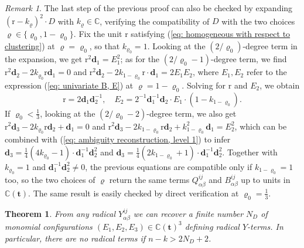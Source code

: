 \documentclass[10pt]{article}
\newtheorem{thm}{Theorem}
\theoremstyle{remark}%
\newtheorem{rem}{Remark}%
\theoremstyle{definition}%
\begin{document}
\begin{rem}
The last step of the previous proof can also be checked by expanding $(\mathrm{r}-k_{\varrho})^{2}\cdot D$ with $k_{\varrho}\in\mathbb{C}$, verifying the compatibility of $D$ with the two choices $\varrho\in\{\varrho_{0},1-\varrho_{0}\}$. Fix the unit $\mathrm{r}$ satisfying (\ref{eq: homogeneous with respect to clustering}) at $\varrho=\varrho_{0}$, so that $k_{\varrho_{0}}=1$. Looking at the $(2/\varrho_{0})$-degree term in the expansion, we get $\mathrm{r}^{2}\mathbf{d}_{1}=E_{1}^{2}$; as for the $(2/\varrho_{0}-1)$-degree term, we find $\mathrm{r}^{2}\mathbf{d}_{2}-2k_{\varrho_{0}}\mathrm{r}\mathbf{d}_{1}=0$ and $\mathrm{r}^{2}\mathbf{d}_{2}-2k_{1-\varrho_{0}}\mathrm{r}\cdot\mathbf{d}_{1}=2E_{1}E_{2}$, where $E_{1},E_{2}$ refer to the expression (\ref{eq: univariate B, E}) at $\varrho=1-\varrho_{0}$. Solving for $\mathrm{r}$ and $E_{2}$, we obtain 
\begin{equation}
    \mathrm{r}=2\mathbf{d}_{1}\mathbf{d}_{2}^{-1},\quad E_{2}=2^{-1}\mathbf{d}_{1}^{-1}\mathbf{d}_{2}\cdot E_{1}\cdot(1-k_{1-\varrho_{0}}).
\label{eq: ambiguity reconstruction, level 1}
\end{equation}
If $\varrho_{0}<\frac{1}{3}$, looking at the $(2/\varrho_{0}-2)$-degree term, we also get $\mathrm{r}^{2}\mathbf{d}_{3}-2k_{\varrho_{0}}\mathrm{r}\mathbf{d}_{2}+\mathbf{d}_{1}=0$ and $\mathrm{r}^{2}\mathbf{d}_{3}-2k_{1-\varrho_{0}}\mathrm{r}\mathbf{d}_{2}+k_{1-\varrho_{0}}^{2}\mathbf{d}_{1}=E_{2}^{2}$, which can be combined with (\ref{eq: ambiguity reconstruction, level 1}) to infer $\mathbf{d}_{3}=\frac{1}{4}(4k_{\varrho_{0}}-1)\cdot\mathbf{d}_{1}^{-1}\mathbf{d}_{2}^{2}$ and $\mathbf{d}_{3}=\frac{1}{4}(2k_{1-\varrho_{0}}+1)\cdot\mathbf{d}_{1}^{-1}\mathbf{d}_{2}^{2}$. Together with $k_{\varrho_{0}}=1$ and $\mathbf{d}_{1}^{-1}\mathbf{d}_{2}^{2}\neq0$, the previous equations are compatible only if $k_{1-\varrho_{0}}=1$ too, so the two choices of $\varrho$ return the same terms $Q_{\alpha\beta}^{ij}$ and $B_{\alpha\beta}^{ij}$ up to units in $\mathbb{C}(\mathbf{t})$. The same result is easily checked by direct verification at $\varrho_{0}=\frac{1}{3}$. 
\end{rem}
\begin{thm}
\label{thm: distinguishability terms from Y} From any radical $Y_{\alpha\beta}^{ij}$
we can recover a finite number $N_{D}$ of monomial configurations $(E_{1},E_{2},E_{3})\in\mathbb{C}(\mathbf{t})^{3}$ defining radical $Y$-terms. 
In particular, there are no radical terms if $n-k > 2 N_{D}+2$. 
\end{thm}
\end{document}
